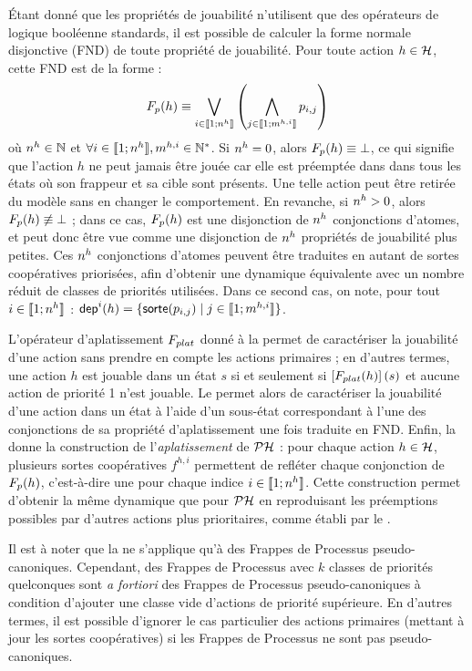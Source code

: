 Étant donné que les propriétés de jouabilité n'utilisent que des opérateurs de logique booléenne
standards, il est possible de calculer la forme normale disjonctive (FND) de toute propriété de
jouabilité. Pour toute action $h \in \mathcal{H}$, cette FND est de la forme :
\[F_{p}(h) \equiv \bigvee_{i \in \mathopen{\llbracket}1\mathclose{};n^{h}\mathclose{\rrbracket}}
  \left( \bigwedge_{j \in \mathopen{\llbracket}1\mathclose{};m^{h,i}\mathclose{\rrbracket}} p_{i,j} \right)\]
où $n^{h} \in \mathbb{N}$ et $\forall i \in \mathopen{\llbracket}1\mathclose{};n^{h}\mathclose{\rrbracket}, m^{h,i} \in \mathbb{N}^*$.
Si $n^{h} = 0$, alors $F_{p}(h) \equiv \bot$, ce qui signifie que l'action $h$ ne peut jamais
être jouée car elle est préemptée dans dans tous les états où son frappeur et sa cible
sont présents.
Une telle action peut être retirée du modèle sans en changer le comportement.
En revanche, si $n^{h} > 0$, alors $F_{p}(h) \not\equiv \bot$ ;
dans ce cas, $F_{p}(h)$ est une disjonction de $n^{h}$ conjonctions d'atomes,
et peut donc être vue comme une disjonction de $n^{h}$ propriétés de jouabilité plus petites.
Ces $n^{h}$ conjonctions d'atomes peuvent être traduites en autant de sortes
coopératives priorisées, afin d'obtenir une dynamique équivalente avec un nombre réduit
de classes de priorités utilisées.
Dans ce second cas, on note, pour tout $i \in \mathopen{\llbracket}1\mathclose{};n^{h}\mathclose{\rrbracket}$ :
$\mathsf{dep}^{i}(h) = \{ \mathsf{sorte}(p_{i,j}) \mid j \in \mathopen{\llbracket}1\mathclose{};m^{h,i}\mathclose{\rrbracket} \}$.

L'opérateur d'aplatissement $F_{plat}$ donné à la 
permet de caractériser la jouabilité d'une action sans prendre en compte les actions primaires ;
en d'autres termes, une action $h$ est jouable dans un état $s$ si et seulement si
$\left[F_{plat}(h)\right](s)$ et aucune action de priorité 1 n'est jouable.
Le  permet alors de caractériser la jouabilité d'une action dans un état
à l'aide d'un sous-état correspondant à l'une des conjonctions de sa propriété
d'aplatissement une fois traduite en FND.
Enfin, la  donne la construction de l'\emph{aplatissement} de $\mathcal{PH}$ :
pour chaque action $h \in \mathcal{H}$, plusieurs sortes coopératives $f^{h,i}$
permettent de refléter chaque conjonction de $F_{p}(h)$,
c'est-à-dire une pour chaque indice $i \in \mathopen{\llbracket}1\mathclose{};n^{h}\mathclose{\rrbracket}$.
Cette construction permet d'obtenir la même dynamique que pour $\mathcal{PH}$ en reproduisant
les préemptions possibles par d'autres actions plus prioritaires,
comme établi par le .

Il est à noter que la  ne s'applique qu'à des Frappes de Processus
pseudo-canoniques. Cependant, des Frappes de Processus avec $k$ classes de priorités quelconques
sont \textit{a fortiori} des Frappes de Processus pseudo-canoniques à condition d'ajouter
une classe vide d'actions de priorité supérieure.
En d'autres termes, il est possible d'ignorer le cas particulier des actions primaires
(mettant à jour les sortes coopératives) si les Frappes de Processus ne sont pas
pseudo-canoniques.

